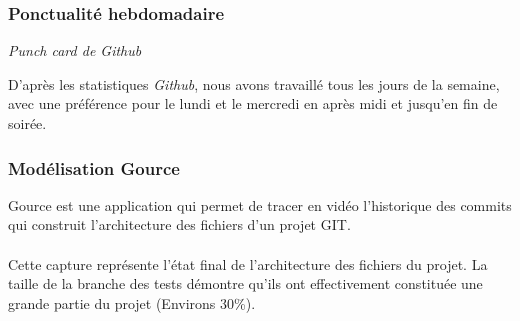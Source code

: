 \subsubsection{Ponctualité hebdomadaire}

\noindent
{}
\begin{center}
\textit{Punch card de Github}
\end{center}

D’après les statistiques \emph{Github}, nous avons travaillé tous les jours de la semaine, avec une préférence pour le lundi et le mercredi en après midi et jusqu’en fin de soirée.

\subsubsection{Modélisation Gource}

Gource est une application qui permet de tracer en vidéo l’historique des commits qui construit l’architecture des fichiers d’un projet GIT.

\paragraph{}
Cette capture représente l’état final de l’architecture des fichiers du projet. La taille de la branche des tests démontre qu'ils ont effectivement constituée une grande partie du projet (Environs 30\%).


